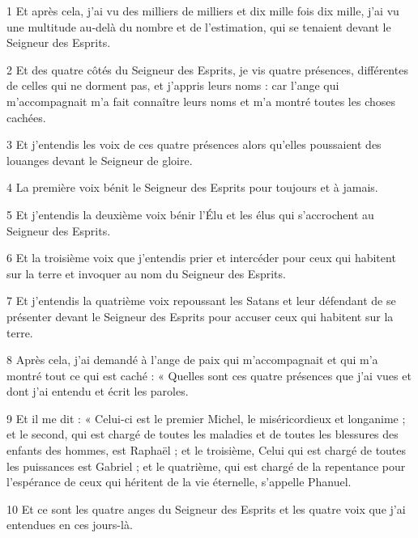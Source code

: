 
\par 1 Et après cela, j'ai vu des milliers de milliers et dix mille fois dix mille, j'ai vu une multitude au-delà du nombre et de l'estimation, qui se tenaient devant le Seigneur des Esprits.
\par 2 Et des quatre côtés du Seigneur des Esprits, je vis quatre présences, différentes de celles qui ne dorment pas, et j'appris leurs noms : car l'ange qui m'accompagnait m'a fait connaître leurs noms et m'a montré toutes les choses cachées.
\par 3 Et j'entendis les voix de ces quatre présences alors qu'elles poussaient des louanges devant le Seigneur de gloire.
\par 4 La première voix bénit le Seigneur des Esprits pour toujours et à jamais.
\par 5 Et j'entendis la deuxième voix bénir l'Élu et les élus qui s'accrochent au Seigneur des Esprits.
\par 6 Et la troisième voix que j'entendis prier et intercéder pour ceux qui habitent sur la terre et invoquer au nom du Seigneur des Esprits.
\par 7 Et j'entendis la quatrième voix repoussant les Satans et leur défendant de se présenter devant le Seigneur des Esprits pour accuser ceux qui habitent sur la terre.
\par 8 Après cela, j'ai demandé à l'ange de paix qui m'accompagnait et qui m'a montré tout ce qui est caché : « Quelles sont ces quatre présences que j'ai vues et dont j'ai entendu et écrit les paroles.
\par 9 Et il me dit : « Celui-ci est le premier Michel, le miséricordieux et longanime ; et le second, qui est chargé de toutes les maladies et de toutes les blessures des enfants des hommes, est Raphaël ; et le troisième, Celui qui est chargé de toutes les puissances est Gabriel ; et le quatrième, qui est chargé de la repentance pour l'espérance de ceux qui héritent de la vie éternelle, s'appelle Phanuel.
\par 10 Et ce sont les quatre anges du Seigneur des Esprits et les quatre voix que j'ai entendues en ces jours-là.


